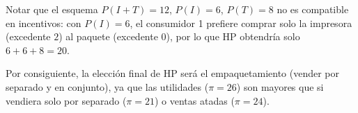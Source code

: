 \begin{parts}
\begin{solution}
Notar que el esquema $P(I+T) = 12$, $P(I) = 6$, $P(T) = 8$ no es compatible en incentivos: con $P(I) = 6$, el consumidor 1 prefiere comprar solo la impresora (excedente $2$) al paquete (excedente $0$), por lo que HP obtendría solo $6 + 6 + 8 = 20$.

Por consiguiente, la elección final de HP será el empaquetamiento (vender por separado y en conjunto), ya que las utilidades ($\pi = 26$) son mayores que si vendiera solo por separado ($\pi = 21$) o ventas atadas ($\pi = 24$).

\end{solution}
\end{parts}

